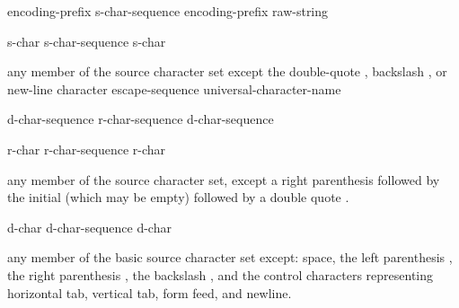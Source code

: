 %
\begin{bnf}
\br
    encoding-prefix\opt {} s-char-sequence\opt {}\br
    encoding-prefix\opt {} raw-string
\end{bnf}

\begin{bnf}
\br
  \br
  \br
  \br
\end{bnf}

\begin{bnf}
\br
    s-char\br
    s-char-sequence s-char
\end{bnf}

\begin{bnftab}
\br
\>\textnormal{any member of the source character set except}\br
\>\>\textnormal{the double-quote , backslash \terminal{\textbackslash}, or new-line character}\br
\>escape-sequence\br
\>universal-character-name
\end{bnftab}

\begin{bnf}
\br
     d-char-sequence\opt \terminal{(} r-char-sequence\opt \terminal{)} d-char-sequence\opt {}
\end{bnf}

\begin{bnf}
\br
    r-char\br
    r-char-sequence r-char
\end{bnf}

\begin{bnftab}
\br
\>\textnormal{any member of the source character set, except}\br
\>\>\textnormal{a right parenthesis \terminal{)} followed by the initial }\br
\>\>\textnormal{(which may be empty) followed by a double quote .}\br
\end{bnftab}

\begin{bnf}
\br
    d-char\br
    d-char-sequence d-char
\end{bnf}

\begin{bnftab}
\br
\>\textnormal{any member of the basic source character set except:}\br
\>\>\textnormal{space, the left parenthesis \terminal{(}, the right parenthesis \terminal{)}, the backslash \terminal{\textbackslash},}\br
\>\>\textnormal{and the control characters representing horizontal tab,}\br
\>\>\textnormal{vertical tab, form feed, and newline.}
\end{bnftab}

